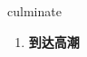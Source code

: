 
\begin{frame}
{\huge culminate}
\begin{center}
\begin{enumerate}\Large
  \item \textbf{到达高潮}
\end{enumerate}
\end{center}
\end{frame}
